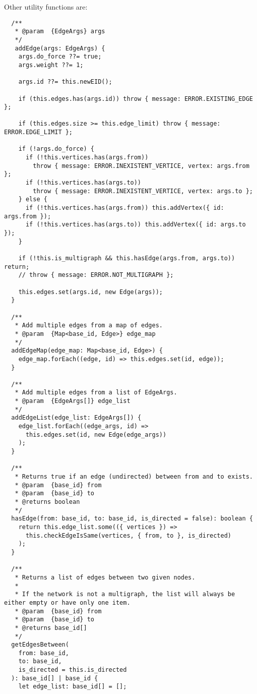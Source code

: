 Other utility functions are:

\begin{verbatim}
  /**
   * @param  {EdgeArgs} args
   */
   addEdge(args: EdgeArgs) {
    args.do_force ??= true;
    args.weight ??= 1;

    args.id ??= this.newEID();

    if (this.edges.has(args.id)) throw { message: ERROR.EXISTING_EDGE };

    if (this.edges.size >= this.edge_limit) throw { message: ERROR.EDGE_LIMIT };

    if (!args.do_force) {
      if (!this.vertices.has(args.from))
        throw { message: ERROR.INEXISTENT_VERTICE, vertex: args.from };
      if (!this.vertices.has(args.to))
        throw { message: ERROR.INEXISTENT_VERTICE, vertex: args.to };
    } else {
      if (!this.vertices.has(args.from)) this.addVertex({ id: args.from });
      if (!this.vertices.has(args.to)) this.addVertex({ id: args.to });
    }

    if (!this.is_multigraph && this.hasEdge(args.from, args.to)) return;
    // throw { message: ERROR.NOT_MULTIGRAPH };

    this.edges.set(args.id, new Edge(args));
  }

  /**
   * Add multiple edges from a map of edges.
   * @param  {Map<base_id, Edge>} edge_map
   */
  addEdgeMap(edge_map: Map<base_id, Edge>) {
    edge_map.forEach((edge, id) => this.edges.set(id, edge));
  }

  /**
   * Add multiple edges from a list of EdgeArgs.
   * @param  {EdgeArgs[]} edge_list
   */
  addEdgeList(edge_list: EdgeArgs[]) {
    edge_list.forEach((edge_args, id) =>
      this.edges.set(id, new Edge(edge_args))
    );
  }

  /**
   * Returns true if an edge (undirected) between from and to exists.
   * @param  {base_id} from
   * @param  {base_id} to
   * @returns boolean
   */
  hasEdge(from: base_id, to: base_id, is_directed = false): boolean {
    return this.edge_list.some(({ vertices }) =>
      this.checkEdgeIsSame(vertices, { from, to }, is_directed)
    );
  }

  /**
   * Returns a list of edges between two given nodes.
   *
   * If the network is not a multigraph, the list will always be either empty or have only one item.
   * @param  {base_id} from
   * @param  {base_id} to
   * @returns base_id[]
   */
  getEdgesBetween(
    from: base_id,
    to: base_id,
    is_directed = this.is_directed
  ): base_id[] | base_id {
    let edge_list: base_id[] = [];


\end{verbatim}
